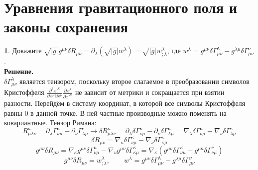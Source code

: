 \documentclass[12pt]{article}
\theoremstyle{definition}
\newtheorem{zad}{}[section]
\begin{document}
\section{Уравнения гравитационного поля и законы сохранения}
\begin{zad}
Докажите $\sqrt{|g|}g^{\mu\nu}\delta R_{\mu\nu}=\partial_\lambda(\sqrt{|g|}w^\lambda)=\sqrt{|g|}w^\lambda_{;\lambda}$, где $w^\lambda=g^{\mu\nu}\delta\Gamma^\lambda_{\mu\nu}-g^{\lambda\mu}\delta\Gamma^\nu_{\mu\nu}$.\\
\textbf{Решение.}\\
$\delta\Gamma^\lambda_{\mu\nu}$ является тензором, поскольку второе слагаемое в преобразовании символов Кристоффеля $\frac{\partial^2 x'^\kappa}{\partial x^\mu\partial x^\nu}\frac{\partial x^\lambda}{\partial x'^\kappa}$ не зависит от метрики и сокращается при взятии разности. Перейдём в систему координат, в которой все символы Кристоффеля равны 0 в данной точке. В ней частные производные можно поменять на ковариантные. Тензор Римана:
\begin{equation}
    R^\kappa_{\mu\lambda\nu}=\partial_\lambda\Gamma^\kappa_{\nu\mu}-\partial_{\nu}\Gamma^\kappa_{\lambda\mu}\rightarrow \delta R^\kappa_{\mu\lambda\nu}=\partial_\lambda\delta\Gamma^\kappa_{\nu\mu}-\partial_{\nu}\delta\Gamma^\kappa_{\lambda\mu}=\nabla_\lambda\delta\Gamma^\kappa_{\nu\mu}-\nabla_{\nu}\delta\Gamma^\kappa_{\lambda\mu}
\end{equation}
\begin{equation}
    \delta R_{\mu\nu}=\nabla_\kappa\delta\Gamma^\kappa_{\nu\mu}-\nabla_{\nu}\delta\Gamma^\kappa_{\kappa\mu}
\end{equation}
\begin{equation}
    g^{\mu\nu}\delta R_{\mu\nu}=\nabla_\kappa g^{\mu\nu}\delta\Gamma^\kappa_{\nu\mu}-\nabla_{\nu}g^{\mu\nu}\delta\Gamma^\kappa_{\kappa\mu}=\nabla_\kappa( g^{\mu\nu}\delta\Gamma^\kappa_{\nu\mu}-g^{\mu\kappa}\delta\Gamma^\nu_{\nu\mu})
\end{equation}
\begin{equation}
    \boxed{g^{\mu\nu}\delta R_{\mu\nu}=w^\lambda_{;\lambda},\quad \quad w^\lambda =g^{\mu\nu}\delta\Gamma^\lambda_{\mu\nu}-g^{\lambda\mu}\delta\Gamma^\nu_{\mu\nu}}
\end{equation}
\end{zad}
\end{document}
